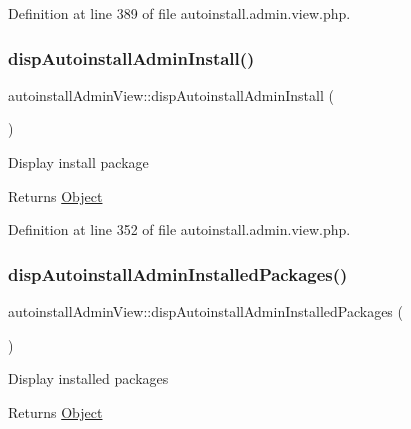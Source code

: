 Definition at line 389 of file autoinstall.\+admin.\+view.\+php.

\hypertarget{classautoinstallAdminView_a096fdb7d03bea9f0b1a48dd5f471bbd2}{}\label{classautoinstallAdminView_a096fdb7d03bea9f0b1a48dd5f471bbd2} 
\subsubsection{\texorpdfstring{disp\+Autoinstall\+Admin\+Install()}{dispAutoinstallAdminInstall()}}
{\footnotesize\ttfamily autoinstall\+Admin\+View\+::disp\+Autoinstall\+Admin\+Install (\begin{DoxyParamCaption}{ }\end{DoxyParamCaption})}

Display install package

\begin{DoxyReturn}{Returns}
\hyperlink{classObject}{Object} 
\end{DoxyReturn}


Definition at line 352 of file autoinstall.\+admin.\+view.\+php.

\hypertarget{classautoinstallAdminView_a57de04bc93c4b62ad0c8fff257b4a837}{}\label{classautoinstallAdminView_a57de04bc93c4b62ad0c8fff257b4a837} 
\subsubsection{\texorpdfstring{disp\+Autoinstall\+Admin\+Installed\+Packages()}{dispAutoinstallAdminInstalledPackages()}}
{\footnotesize\ttfamily autoinstall\+Admin\+View\+::disp\+Autoinstall\+Admin\+Installed\+Packages (\begin{DoxyParamCaption}{ }\end{DoxyParamCaption})}

Display installed packages

\begin{DoxyReturn}{Returns}
\hyperlink{classObject}{Object} 
\end{DoxyReturn}


